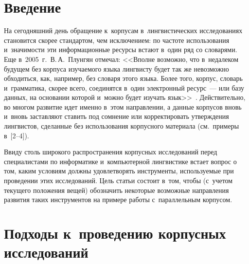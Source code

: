 
  



\thispagestyle{headings}

\begin{multicols}{2}

\label{st\stat}
  
\section{Введение}

На сегодняшний день обращение к~корпусам в~лингвистических 
исследованиях становится скорее стандартом, чем исключением: по частоте 
использования и~значимости эти информационные ресурсы встают в~один 
ряд со словарями. Еще в~2005~г.\ В.\,А.~Плунгян отмечал: <<Вполне 
возможно, что в~недалеком будущем без корпуса изучаемого языка 
лингвисту будет так же невозможно обходиться, как, например, без словаря 
этого языка. Более того, корпус, словарь и~грамматика, скорее всего, 
соединятся в~один электронный ресурс~--- или базу данных, на основании 
которой и~можно будет изучать язык>>~\cite[с.~14]{1-gon}. Действительно, 
во многом развитие идет именно в~этом направлении, а данные корпусов 
вновь и~вновь заставляют ставить под сомнение или корректировать 
утверждения лингвистов, сделанные без использования корпусного 
материала (см.\ примеры в~[2--4]).

Ввиду столь широкого распространения корпусных исследований перед 
специалистами по информатике и~компьютерной лингвистике встает вопрос 
о том, каким условиям должны удовлетворять инструменты, используемые 
при проведении этих исследований. Цель статьи состоит в~том, чтобы 
(с~учетом текущего положения вещей) обозначить некоторые возможные 
направления развития таких инструментов на примере работы 
с~параллельным корпусом.

\section{Подходы к~проведению корпусных исследований}


\end{multicols}
